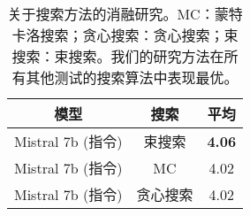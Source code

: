 \begin{table}[!t]
\begin{center}

\begin{tabular}{ c c c  }
    \toprule
    \textbf{模型} & \textbf{搜索} & \textbf{平均} \\

    \midrule
    Mistral 7b (指令) & 束搜索  & \textbf{4.06} \\
    \midrule

    Mistral 7b (指令) &  MC  & 4.02 \\
    Mistral 7b (指令) & 贪心搜索 & 4.02 \\

    \bottomrule

\end{tabular}

\caption{关于搜索方法的消融研究。MC：蒙特卡洛搜索；贪心搜索：贪心搜索；束搜索：束搜索。我们的研究方法在所有其他测试的搜索算法中表现最优。}
\vspace{-10pt}
\label{tab:ablation_search_algo}
\end{center}
\end{table}
